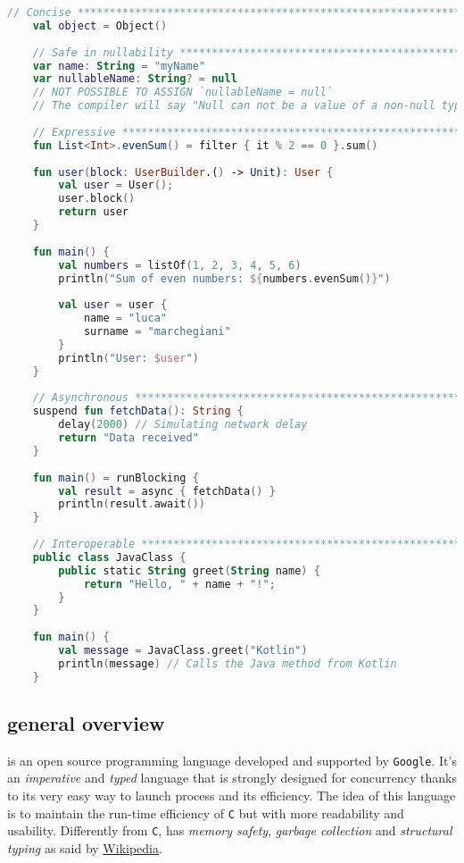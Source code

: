 \begin{lstlisting}[language=kotlin,caption={Exemples of  \Kotlin 's features}]
	// Concise *************************************************************
	val object = Object()
	
	// Safe in nullability *************************************************
	var name: String = "myName"
	var nullableName: String? = null
	// NOT POSSIBLE TO ASSIGN `nullableName = null`
	// The compiler will say "Null can not be a value of a non-null type String"
	
	// Expressive **********************************************************
	fun List<Int>.evenSum() = filter { it % 2 == 0 }.sum()
	
	fun user(block: UserBuilder.() -> Unit): User {
		val user = User();
		user.block()
		return user
	}
	
	fun main() {
		val numbers = listOf(1, 2, 3, 4, 5, 6)
		println("Sum of even numbers: ${numbers.evenSum()}")
		
		val user = user {
			name = "luca"
			surname = "marchegiani"
		}
		println("User: $user")
	}
	
	// Asynchronous ********************************************************
	suspend fun fetchData(): String {
		delay(2000) // Simulating network delay
		return "Data received"
	}
	
	fun main() = runBlocking {
		val result = async { fetchData() }
		println(result.await()) 
	}
	
	// Interoperable *******************************************************
	public class JavaClass {
		public static String greet(String name) {
			return "Hello, " + name + "!";
		}
	}
	
	fun main() {
		val message = JavaClass.greet("Kotlin")
		println(message) // Calls the Java method from Kotlin
	}
\end{lstlisting}

\subsection{\Go general overview}

\Go is an open source programming language developed and supported by \texttt{Google}.
It's an \textit{imperative} and \textit{typed} language that is strongly designed for concurrency thanks to its very easy way to launch process and its efficiency.
The idea of this language is to maintain the run-time efficiency of \texttt{C} but with more readability and usability. Differently from \texttt{C}, \Go has \textit{memory safety}, \textit{garbage collection} and \textit{structural typing} as said by \href{https://en.wikipedia.org/wiki/Go_(programming_language)}{Wikipedia}.

